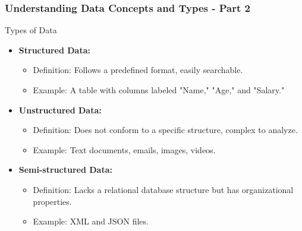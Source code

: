 \documentclass{beamer}
\begin{document}
\begin{frame}[fragile]
    \frametitle{Understanding Data Concepts and Types - Part 2}
    \begin{block}{Types of Data}
        \begin{itemize}
            \item \textbf{Structured Data:} 
                \begin{itemize}
                    \item Definition: Follows a predefined format, easily searchable.
                    \item Example: A table with columns labeled "Name," "Age," and "Salary."
                \end{itemize}
            \item \textbf{Unstructured Data:}
                \begin{itemize}
                    \item Definition: Does not conform to a specific structure, complex to analyze.
                    \item Example: Text documents, emails, images, videos.
                \end{itemize}
            \item \textbf{Semi-structured Data:}
                \begin{itemize}
                    \item Definition: Lacks a relational database structure but has organizational properties.
                    \item Example: XML and JSON files.
                \end{itemize}
        \end{itemize}
    \end{block}
\end{frame}
\end{document}
